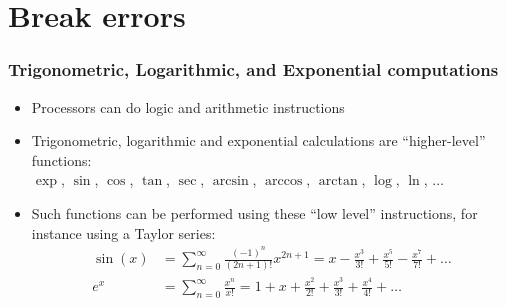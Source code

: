 \documentclass[11pt,table,final,fleqn,xcolor={usenames,dvipsnames}]{beamer}
\begin{document}

\section{Break errors}
\begin{frame}
   \frametitle{Trigonometric, Logarithmic, and Exponential computations}
    \begin{itemize}
      \item Processors can do logic and arithmetic instructions
      \item Trigonometric, logarithmic and exponential calculations are ``higher-level'' functions:\\
      $\exp$, $\sin$, $\cos$, $\tan$, $\sec$, $\arcsin$, $\arccos$, $\arctan$, $\log$, $\ln$, $\ldots$
       \item Such functions can be performed using these ``low level'' instructions, for instance using a Taylor series:
      \begin{align*}
        \sin(x) &= \sum_{n=0}^{\infty} \frac{(-1)^n}{(2n+1)!}x^{2n+1} =  x - \frac{x^3}{3!} + \frac{x^5}{5!} - \frac{x^7}{7!} + \ldots \\
         e^x &= \sum_{n=0}^\infty \frac{x^n}{x!} = 1 + x + \frac{x^2}{2!} + \frac{x^3}{3!} + \frac{x^4}{4!} + \ldots
      \end{align*}
    \end{itemize}
\end{frame}
\end{document}
